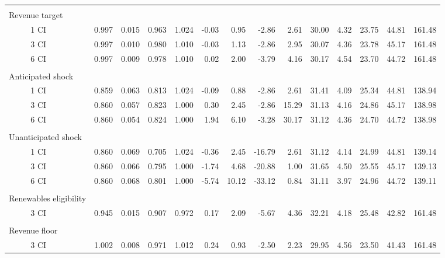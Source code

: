 \begin{tabular}{ll*{13}{r}}
&&&&&&&&&&&&&& \\ \multicolumn{2}{l}{Revenue target} &&&&&&&&&&&&&\\ & 1 CI &                    0.997 &  0.015 &  0.963 &  1.024 &                   -0.03 &   0.95 &   -2.86 &   2.61 &          30.00 &  4.32 &  23.75 &  44.81 &                 161.48 \\
              & 3 CI &                    0.997 &  0.010 &  0.980 &  1.010 &                   -0.03 &   1.13 &   -2.86 &   2.95 &          30.07 &  4.36 &  23.78 &  45.17 &                 161.48 \\
              & 6 CI &                    0.997 &  0.009 &  0.978 &  1.010 &                    0.02 &   2.00 &   -3.79 &   4.16 &          30.17 &  4.54 &  23.70 &  44.72 &                 161.48 \\
&&&&&&&&&&&&&& \\ \multicolumn{2}{l}{Anticipated shock} &&&&&&&&&&&&&\\& 1 CI &                    0.859 &  0.063 &  0.813 &  1.024 &                   -0.09 &   0.88 &   -2.86 &   2.61 &          31.41 &  4.09 &  25.34 &  44.81 &                 138.94 \\
              & 3 CI &                    0.860 &  0.057 &  0.823 &  1.000 &                    0.30 &   2.45 &   -2.86 &  15.29 &          31.13 &  4.16 &  24.86 &  45.17 &                 138.98 \\
              & 6 CI &                    0.860 &  0.054 &  0.824 &  1.000 &                    1.94 &   6.10 &   -3.28 &  30.17 &          31.12 &  4.36 &  24.70 &  44.72 &                 138.98 \\
&&&&&&&&&&&&&& \\ \multicolumn{2}{l}{Unanticipated shock} &&&&&&&&&&&&&\\ & 1 CI &                    0.860 &  0.069 &  0.705 &  1.024 &                   -0.36 &   2.45 &  -16.79 &   2.61 &          31.12 &  4.14 &  24.99 &  44.81 &                 139.14 \\
              & 3 CI &                    0.860 &  0.066 &  0.795 &  1.000 &                   -1.74 &   4.68 &  -20.88 &   1.00 &          31.65 &  4.50 &  25.55 &  45.17 &                 139.13 \\
              & 6 CI &                    0.860 &  0.068 &  0.801 &  1.000 &                   -5.74 &  10.12 &  -33.12 &   0.84 &          31.11 &  3.97 &  24.96 &  44.72 &                 139.11 \\
&&&&&&&&&&&&&& \\ \multicolumn{2}{l}{Renewables eligibility} &&&&&&&&&&&&&\\& 3 CI &                    0.945 &  0.015 &  0.907 &  0.972 &                    0.17 &   2.09 &   -5.67 &   4.36 &          32.21 &  4.18 &  25.48 &  42.82 &                 161.48 \\
&&&&&&&&&&&&&& \\ \multicolumn{2}{l}{Revenue floor} &&&&&&&&&&&&&\\& 3 CI &                    1.002 &  0.008 &  0.971 &  1.012 &                    0.24 &   0.93 &   -2.50 &   2.23 &          29.95 &  4.56 &  23.50 &  41.43 &                 161.48 \\
\bottomrule
\end{tabular}
